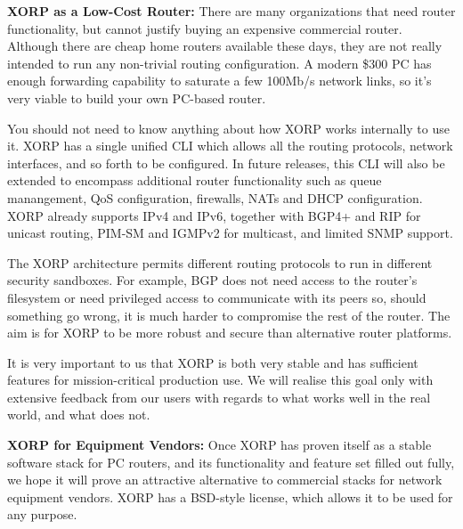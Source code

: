\vspace{0.1in}\noindent\textbf{XORP as a Low-Cost Router:}
There are many organizations that need router functionality, but
cannot justify buying an expensive commercial router.  Although there
are cheap home routers available these days, they are not really
intended to run any non-trivial routing configuration.  A modern \$300
PC has enough forwarding capability to saturate a few 100Mb/s network
links, so it's very viable to build your own PC-based router.

You should not need to know anything about how XORP
works internally to use it.  XORP has a single unified
CLI which allows all the routing protocols, network
interfaces, and so forth to be configured.  In future releases, this
CLI will also be extended to encompass additional router functionality
such as queue manangement, QoS configuration, firewalls, NATs and DHCP
configuration. XORP already supports IPv4 and IPv6, together with BGP4+ and RIP for
unicast routing, PIM-SM and IGMPv2 for multicast, and limited SNMP
support.  


The XORP architecture permits different
routing protocols to run in different security sandboxes.  For
example, BGP does not need access to the router's filesystem or need
privileged access to communicate with its peers so, should something
go wrong, it is much harder to compromise the rest of the router.  The
aim is for XORP to be more robust and secure than alternative router
platforms.

It is very important to us that XORP is both very stable and has
sufficient features for mission-critical production use.  We will
realise this goal only with extensive feedback from our users with
regards to what works well in the real world, and what does not.


\vspace{0.1in}\noindent\textbf{XORP for Equipment Vendors:}
Once XORP has proven itself as a stable software stack for PC routers,
and its functionality and feature set filled out fully, we hope it
will prove an attractive alternative to commercial stacks for network
equipment vendors. XORP has a BSD-style license, which allows it to be used
for any purpose. %

